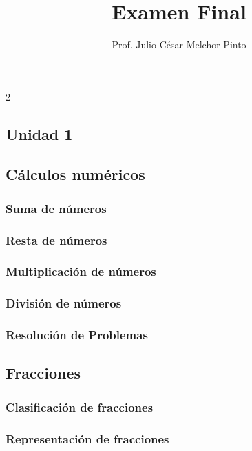 \documentclass[12pt,addpoints,answers]{evalua}
\title{Examen Final}
\author{Prof. Julio César Melchor Pinto}
\begin{document}
\newpage
\begin{multicols}{2}
	\tableofcontents
\end{multicols}
\begin{questions}
	\section{Unidad 1}
	\subsection   {Cálculos numéricos}
	\subsubsection{Suma de números}
	\question[1]{}
	\subsubsection{Resta de números}
	\question[1]{}
	\subsubsection{Multiplicación de números}
	\question[1]{}
	\subsubsection{División de números}
	\question[1]{}
	\subsubsection{Resolución de Problemas}
	\question[1]{}
	\subsection   {Fracciones}
	\subsubsection{Clasificación de fracciones}
	\question[1]{}
	\subsubsection{Representación de fracciones}
	\question[1]{}

\end{questions}
\end{document}
